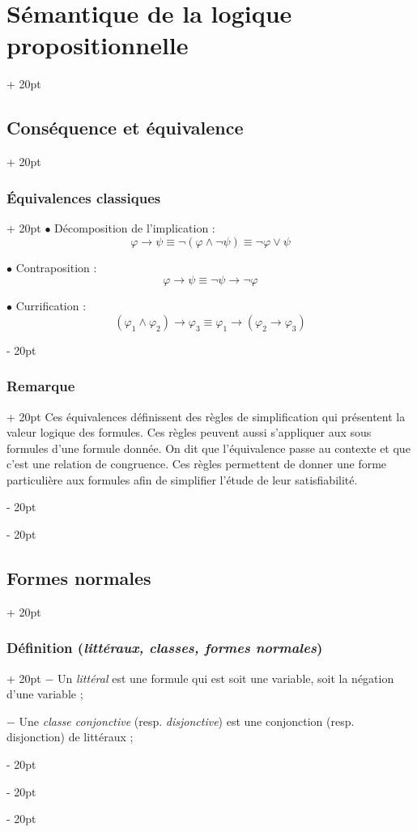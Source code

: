 \documentclass[a4paper, 12pt, twoside]{article}
\newcommand{\ind}[1][20pt]{\advance\leftskip + #1}
\newcommand{\deind}[1][20pt]{\advance\leftskip - #1}
\newenvironment{indt}[2][20pt]{#2 \par \ind[#1]}{\par \deind} %
\begin{document}
\begin{indt}{\section{Sémantique de la logique propositionnelle}}
\begin{indt}{\subsection{Conséquence et équivalence}}
\begin{indt}{\subsubsection{\'Equivalences classiques}}
                $\bullet$ Décomposition de l'implication :
                    \[ \varphi \rightarrow \psi \equiv \neg (\varphi \wedge \neg \psi) \equiv \neg \varphi \vee \psi \]
                
                $\bullet$ Contraposition :
                    \[ \varphi \rightarrow \psi \equiv \neg \psi \rightarrow \neg \varphi \]
                
                $\bullet$ Currification :
                    \[ (\varphi_1 \wedge \varphi_2) \rightarrow \varphi_3 \equiv \varphi_1 \rightarrow (\varphi_2 \rightarrow \varphi_3) \]
            \end{indt}
            
            \vspace{12pt}
            
            \begin{indt}{\subsubsection{Remarque}}
                Ces équivalences définissent des règles de simplification qui présentent la valeur logique des formules. Ces règles peuvent aussi s'appliquer aux sous formules d'une formule donnée. On dit que l'équivalence passe au contexte et que c'est une relation de congruence. Ces règles permettent de donner une forme particulière aux formules afin de simplifier l'étude de leur satisfiabilité.
            \end{indt}
        \end{indt}
        
        \vspace{12pt}
        
        \begin{indt}{\subsection{Formes normales}}
            \begin{indt}{\subsubsection{Définition (\textit{littéraux, classes, formes normales})}}
                $-$ Un \textit{littéral} est une formule qui est soit une variable, soit la négation d'une variable ;
                
                $-$ Une \textit{classe conjonctive} (resp. \textit{disjonctive}) est une conjonction (resp. disjonction) de littéraux ;
                

\end{indt}
\end{indt}
\end{indt}
\end{document}
